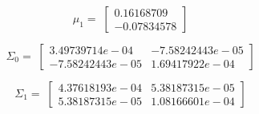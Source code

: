 \documentclass[11pt]{article}
\begin{document}
\begin{equation*}
\mu_1 = \;
\begin{bmatrix}
0.16168709\\
-0.07834578
\end{bmatrix}
\end{equation*}

\begin{equation*}
\Sigma_0 = \;
\begin{bmatrix}
3.49739714e-04& -7.58242443e-05\\
-7.58242443e-05&  1.69417922e-04
\end{bmatrix}
\end{equation*}

\begin{equation*}
\Sigma_1 = \;
\begin{bmatrix}
4.37618193e-04& 5.38187315e-05\\
5.38187315e-05& 1.08166601e-04
\end{bmatrix}
\end{equation*}
\end{document}
